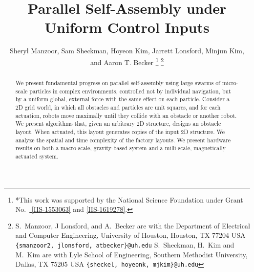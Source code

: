 \documentclass[letterpaper, 10 pt, conference]{ieeeconf}
\begin{document}
\title{\LARGE \bf 
Parallel Self-Assembly under Uniform Control Inputs 
}
\author{Sheryl Manzoor, Sam Sheckman, Hoyeon Kim, Jarrett Lonsford, Minjun Kim, and Aaron T. Becker%
\thanks{*This work was supported by the National Science Foundation under Grant No.\ \href{http://nsf.gov/awardsearch/showAward?AWD_ID=1553063}{ [IIS-1553063]} and \href{http://nsf.gov/awardsearch/showAward?AWD_ID=1619278}{[IIS-1619278]}.}%
\thanks{S.~Manzoor, J Lonsford, and  A.~Becker are with the Department of Electrical and Computer Engineering,  University of Houston, Houston, TX 77204 USA        {\tt\small  \{smanzoor2, jlonsford, atbecker\}@uh.edu}
S.~Sheckman, H.~Kim and M.~Kim are with Lyle School of Engineering,   Southern Methodist University, Dallas, TX 75205 USA        {\tt\small  \{sheckel, hoyeonk, mjkim\}@uh.edu}
}
}
\maketitle


\begin{abstract} 
We present fundamental progress on parallel self-assembly using large swarms of micro-scale particles
in complex environments, controlled not by individual navigation, but by a uniform global, external force with the same effect on each particle.
Consider a 2D grid world, in which all obstacles and particles are unit squares,
and for each actuation, robots move maximally until they collide with an obstacle or another robot. 
We present algorithms that, given an arbitrary 2D structure, designs an obstacle layout.
 When actuated, this layout generates copies of the input 2D structure.
We analyze the spatial and time complexity of the factory layouts. 
We present hardware results on both a macro-scale, gravity-based system and a milli-scale, magnetically actuated system.








\end{abstract}












\newpage
\tableofcontents
\setcounter{tocdepth}{3}
\mbox{}
\end{document}
